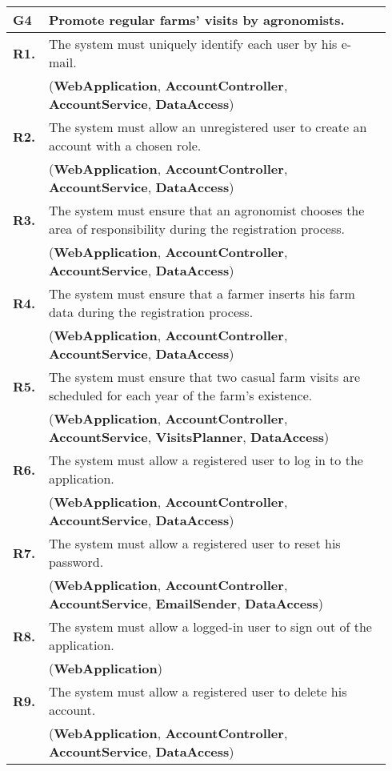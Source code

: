 \begin{longtable}{p{0.06\linewidth} p{0.88\linewidth}} 
    \toprule
    \textbf{G4} & Promote regular farms’ visits by agronomists. \\ 
    \midrule
	\textbf{R1.} & The system must uniquely identify each user by his e-mail. \\
	& (\textbf{WebApplication}, \textbf{AccountController}, \textbf{AccountService}, \textbf{DataAccess})\\
	\textbf{R2.} & The system must allow an unregistered user to create an account with a chosen role. \\
	& (\textbf{WebApplication}, \textbf{AccountController}, \textbf{AccountService}, \textbf{DataAccess})\\
	\textbf{R3.} & The system must ensure that an agronomist chooses the area of responsibility during the registration process. \\
	& (\textbf{WebApplication}, \textbf{AccountController}, \textbf{AccountService}, \textbf{DataAccess})\\
	\textbf{R4.} & The system must ensure that a farmer inserts his farm data during the registration process.\\
	& (\textbf{WebApplication}, \textbf{AccountController}, \textbf{AccountService}, \textbf{DataAccess})\\
	\textbf{R5.} & The system must ensure that two casual farm visits are scheduled for each year of the farm's existence.\\
	& (\textbf{WebApplication}, \textbf{AccountController}, \textbf{AccountService}, \textbf{VisitsPlanner}, \textbf{DataAccess})\\
	\textbf{R6.} & The system must allow a registered user to log in to the application. \\
	& (\textbf{WebApplication}, \textbf{AccountController}, \textbf{AccountService}, \textbf{DataAccess})\\
	\textbf{R7.} & The system must allow a registered user to reset his password. \\
	& (\textbf{WebApplication}, \textbf{AccountController}, \textbf{AccountService}, \textbf{EmailSender}, \textbf{DataAccess})\\
	\textbf{R8.} & The system must allow a logged-in user to sign out of the application. \\
	& (\textbf{WebApplication})\\
	\textbf{R9.} & The system must allow a registered user to delete his account. \\
	& (\textbf{WebApplication}, \textbf{AccountController}, \textbf{AccountService}, \textbf{DataAccess})\\
	

\end{longtable}
